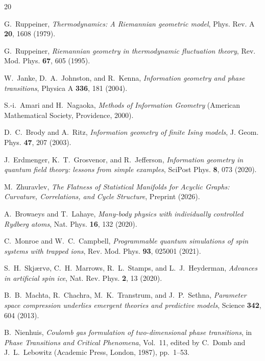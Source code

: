 \documentclass[aps,prl,twocolumn,superscriptaddress,showpacs]{revtex4-2}
\begin{document}
\begin{thebibliography}{20}

G.~Ruppeiner,
\textit{Thermodynamics: A Riemannian geometric model},
Phys. Rev. A \textbf{20}, 1608 (1979).

G.~Ruppeiner,
\textit{Riemannian geometry in thermodynamic fluctuation theory},
Rev. Mod. Phys. \textbf{67}, 605 (1995).

W.~Janke, D.~A.~Johnston, and R.~Kenna,
\textit{Information geometry and phase transitions},
Physica A \textbf{336}, 181 (2004).

S.-i.~Amari and H.~Nagaoka,
\textit{Methods of Information Geometry}
(American Mathematical Society, Providence, 2000).

D.~C.~Brody and A.~Ritz,
\textit{Information geometry of finite Ising models},
J. Geom. Phys. \textbf{47}, 207 (2003).

J.~Erdmenger, K.~T.~Grosvenor, and R.~Jefferson,
\textit{Information geometry in quantum field theory: lessons from simple
  examples},
SciPost Phys. \textbf{8}, 073 (2020).

M.~Zhuravlev,
\textit{The Flatness of Statistical Manifolds for Acyclic Graphs:
  Curvature, Correlations, and Cycle Structure},
Preprint (2026).

A.~Browaeys and T.~Lahaye,
\textit{Many-body physics with individually controlled Rydberg atoms},
Nat. Phys. \textbf{16}, 132 (2020).

C.~Monroe and W.~C.~Campbell,
\textit{Programmable quantum simulations of spin systems with trapped ions},
Rev. Mod. Phys. \textbf{93}, 025001 (2021).

S.~H.~Skj{\ae}rv{\o}, C.~H.~Marrows, R.~L.~Stamps, and L.~J.~Heyderman,
\textit{Advances in artificial spin ice},
Nat. Rev. Phys. \textbf{2}, 13 (2020).

B.~B.~Machta, R.~Chachra, M.~K.~Transtrum, and J.~P.~Sethna,
\textit{Parameter space compression underlies emergent theories and
  predictive models},
Science \textbf{342}, 604 (2013).

B.~Nienhuis,
\textit{Coulomb gas formulation of two-dimensional phase transitions},
in \textit{Phase Transitions and Critical Phenomena}, Vol.~11,
edited by C.~Domb and J.~L.~Lebowitz (Academic Press, London, 1987),
pp.~1--53.

\end{thebibliography}
\end{document}
